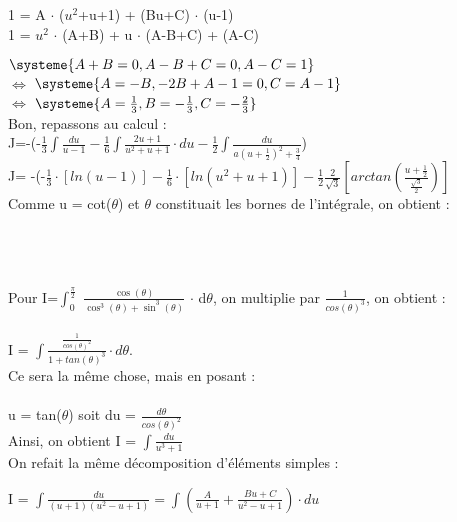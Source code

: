 \documentclass[a4paper,10pt]{article}
\begin{document}
\parindent=0cm
1 = A $\cdot$ ($u^2$+u+1) + (Bu+C) $\cdot$ (u-1) \\
1 = $u^2$ $\cdot$ (A+B) + u $\cdot$ (A-B+C) + (A-C)

\parindent=0.6cm
$\systeme{A+B=0,A-B+C=0, A-C=1}$ \\
$\Leftrightarrow$ $\systeme{A=-B,-2B+A-1=0, C=A-1}$ \\
$\Leftrightarrow$ $\systeme{A=\frac{1}{3}, B=-\frac{1}{3}, C=-\frac{2}{3}}$\\

Bon, repassons au calcul : \\
J=-(-$\frac{1}{3} \int \frac{du}{u-1} - \frac{1}{6} \int \frac{2u+1}{u^2+u+1} \cdot du - \frac{1}{2} \int \frac{du}{a(u+\frac{1}{2})^2 + \frac{3}{4}}$) \\
J= -(-$\frac{1}{3} \cdot \left[ ln(u-1) \right] - \frac{1}{6} \cdot \left[ ln(u^2+u+1) \right] - \frac{1}{2} \frac{2}{\sqrt{3}} \left[ arctan(\frac{u+\frac{1}{2}}{\frac{\sqrt{3}}{2}}) \right] $\\
Comme u = cot($\theta$) et $\theta$ constituait les bornes de l'intégrale, on obtient :  \\
\setlength{\fboxsep}{2.5 mm}
\setlength{\fboxrule}{1 mm}
 
\\ \\ \\
\parindent=0cm
Pour I=$\int_0^{\frac{\pi}{2}}$ $\frac{\cos(\theta)}{\cos^3(\theta)+\sin^3(\theta)}$ $\cdot$ d$\theta$, on multiplie par $\frac{1}{cos(\theta)^3}$, on obtient : \\ \\
I = $\int \frac{\frac{1}{cos(\theta)^2}}{1+tan(\theta)^3} \cdot d\theta.$ \\Ce sera la même chose, mais en posant : \\ \\ u = tan($\theta$) soit du = $\frac{d\theta}{cos(\theta)^2}$ \\

Ainsi, on obtient I = $\int \frac{du}{u^3+1}$ \\
 
On refait la même décomposition d'éléments simples : 

I = $\int \frac{du}{(u+1)(u^2-u+1)} = \int (\frac{A}{u+1} + \frac{Bu+C}{u^2-u+1}) \cdot du$
\end{document}
